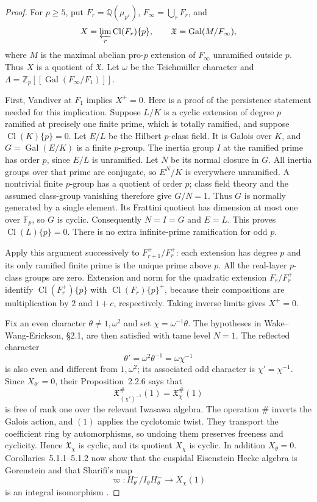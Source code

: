 \begin{proof}
For $p\ge5$, put $F_r=\mathbb Q(\mu_{p^r})$,
$F_\infty=\bigcup_rF_r$, and
\[
 X=\varprojlim_r\operatorname{Cl}(F_r)\{p\},\qquad
 \mathfrak X=\operatorname{Gal}(M/F_\infty),
\]
where $M$ is the maximal abelian pro-$p$ extension of $F_\infty$
unramified outside $p$. Thus $X$ is a quotient of $\mathfrak X$.
Let $\omega$ be the Teichm\"uller character and
$\Lambda=\mathbb Z_p[[\operatorname{Gal}(F_\infty/F_1)]]$.

First, Vandiver at $F_1$ implies $X^+=0$. Here is a proof of the
persistence statement needed for this implication. Suppose $L/K$ is a
cyclic extension of degree $p$ ramified at precisely one finite prime,
which is totally ramified, and suppose $\operatorname{Cl}(K)\{p\}=0$.
Let $E/L$ be the Hilbert $p$-class field. It is Galois over $K$, and
$G=\operatorname{Gal}(E/K)$ is a finite $p$-group. The inertia group $I$
at the ramified prime has order $p$, since $E/L$ is unramified. Let $N$
be its normal closure in $G$. All inertia groups over that prime are
conjugate, so $E^N/K$ is everywhere unramified. A nontrivial finite
$p$-group has a quotient of order $p$; class field theory and the assumed
class-group vanishing therefore give $G/N=1$. Thus $G$ is normally
generated by a single element. Its Frattini quotient has dimension at
most one over $\mathbb F_p$, so $G$ is cyclic. Consequently $N=I=G$
and $E=L$. This proves $\operatorname{Cl}(L)\{p\}=0$.
There is no extra infinite-prime ramification for odd $p$.

Apply this argument successively to $F_{r+1}^+/F_r^+$: each extension
has degree $p$ and its only ramified finite prime is the unique prime
above $p$. All the real-layer $p$-class groups are zero. Extension and
norm for the quadratic extension $F_r/F_r^+$ identify
$\operatorname{Cl}(F_r^+)\{p\}$ with
$\operatorname{Cl}(F_r)\{p\}^+$, because their compositions are
multiplication by $2$ and $1+c$, respectively. Taking inverse limits
gives $X^+=0$.

Fix an even character $\theta\ne1,\omega^2$ and set
$\chi=\omega^{-1}\theta$. The hypotheses in
Wake--Wang-Erickson, \S2.1, are then satisfied with tame level $N=1$.
The reflected character
\[
 \theta'=\omega^2\theta^{-1}=\omega\chi^{-1}
\]
is also even and different from $1,\omega^2$; its associated odd
character is $\chi'=\chi^{-1}$. Since $X_{\theta'}=0$, their
Proposition~2.2.6 says that
\[
 \mathfrak X_{(\chi')^{-1}}^{\#}(1)
   =\mathfrak X_\chi^{\#}(1)
\]
is free of rank one over the relevant Iwasawa algebra. The operation
$\#$ inverts the Galois action, and $(1)$ applies the cyclotomic twist.
They transport the coefficient ring by automorphisms, so undoing them
preserves freeness and cyclicity. Hence $\mathfrak X_\chi$ is cyclic,
and its quotient $X_\chi$ is cyclic. In addition $X_\theta=0$.
Corollaries~5.1.1--5.1.2 now show that the cuspidal Eisenstein Hecke
algebra is Gorenstein and that Sharifi's map
\[
 \varpi:H^-_\theta/I_\theta H^-_\theta
       \longrightarrow X_\chi(1)
\]
is an integral isomorphism
\cite[\S2.1, Proposition~2.2.6, Corollaries~5.1.1--5.1.2;
preprint pp.~2--4 and~11]{WakeWangErickson2017}.


\end{proof}
